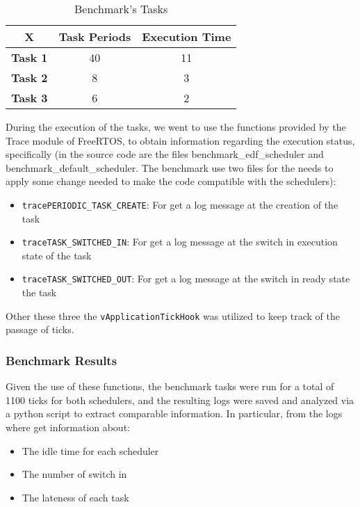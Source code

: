 \documentclass{article}
\begin{document}
\begin{table}[H]
    \centering
    \begin{tabular}{c|cc}
        \textbf{X} & \textbf{Task Periods} & \textbf{Execution Time} \\
         \hline
       \textbf{Task 1}  & 40 & 11 \\
       \textbf{Task 2}  & 8 & 3 \\
       \textbf{Task 3}  & 6 & 2 \\
    \end{tabular}
    \caption{Benchmark's Tasks}
    \label{tab:Tasks}
\end{table}

During the execution of the tasks, we went to use the functions provided by the Trace module of FreeRTOS, to obtain information regarding the execution status, specifically (in the source code are the files benchmark\_edf\_scheduler and benchmark\_default\_scheduler. The benchmark use two files for the needs to apply some change needed to make the code compatible with the schedulers):
\begin{itemize}
    \item \texttt{tracePERIODIC_TASK_CREATE}: For get a log message at the creation of the task
    \item \texttt{traceTASK_SWITCHED_IN}: For get a log message at the switch in execution state of the task
    \item \texttt{traceTASK_SWITCHED_OUT}: For get a log message at the switch in ready state the task
\end{itemize}
Other these three the \texttt{vApplicationTickHook} was utilized to keep track of the passage of ticks. \\

\subsubsection{Benchmark Results}
Given the use of these functions, the benchmark tasks were run for a total of 1100 ticks for both schedulers, and the resulting logs were saved and analyzed via a python script to extract comparable information. In particular, from the logs where get information about:
\begin{itemize}
    \item The idle time for each scheduler
    \item The number of switch in
    \item The lateness of each task
\end{itemize}
\end{document}
